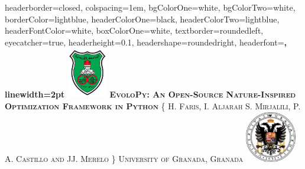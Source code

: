 \documentclass[landscape,a0paper,fontscale=0.285]{baposter} %
\begin{document}
\begin{poster}
{
headerborder=closed, %
colspacing=1em, %
bgColorOne=white, %
bgColorTwo=white, %
borderColor=lightblue, %
headerColorOne=black, %
headerColorTwo=lightblue, %
headerFontColor=white, %
boxColorOne=white, %
textborder=roundedleft, %
eyecatcher=true, %
headerheight=0.1\textheight, %
headershape=roundedright, %
headerfont=\Large\bf\textsc, %
linewidth=2pt %
}
%
{\includegraphics[height=6em]{julogo}} %
{\bf\textsc{EvoloPy: An Open-Source Nature-Inspired Optimization Framework in Python}\vspace{0.5em}} %
{\textsc{\{ H. Faris, I. Aljarah S. Mirjalili, P. A. Castillo and JJ. Merelo \} \hspace{12pt}  University of Granada, Granada}} %
{\includegraphics[height=6em]{granadalogo}} %


\end{poster}
\end{document}
